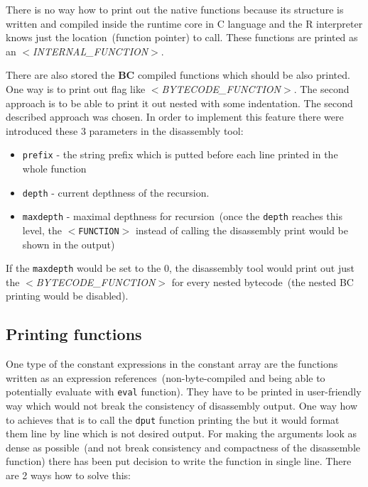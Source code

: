 \documentclass[thesis=M,english]{FITthesis}[2018/10/20]
\newcommand{\code}[1]{\texttt{#1}}
\begin{document}
There is no way how to print out the native functions because its structure is written and compiled inside the runtime core in C language and the R interpreter knows just the location~(function pointer) to call. These functions are printed as an \textit{$<$INTERNAL{\_}FUNCTION$>$}. 

There are also stored the \textbf{BC} compiled functions which should be also printed. One way is to print out flag like \textit{$<$BYTECODE{\_}FUNCTION$>$}. The second approach is to be able to print it out nested with some indentation. The second described approach was chosen. In order to implement this feature there were introduced these 3 parameters in the disassembly tool:

\begin{itemize}
	\item \code{prefix} - the string prefix which is putted before each line printed in the whole function
	
	\item \code{depth} - current depthness of the recursion.
 	
	\item \code{maxdepth} - maximal depthness for recursion~(once the \code{depth} reaches this level, the \code{$<$FUNCTION$>$} instead of calling the disassembly print would be shown in the output)
\end{itemize}

If the \code{maxdepth} would be set to the 0, the disassembly tool would print out just the \textit{$<$BYTECODE{\_}FUNCTION$>$} for every nested bytecode~(the nested BC printing would be disabled).


\subsection{Printing functions}


One type of the constant expressions in the constant array are the functions written as an expression references~(non-byte-compiled and being able to potentially evaluate with \code{eval} function). They have to be printed in user-friendly way which would not break the consistency of disassembly output. One way how to achieves that is to call the \code{dput} function printing the but it would format them line by line which is not desired output. For making the arguments look as dense as possible~(and not break consistency and compactness of the disassemble function) there has been put decision to write the function in single line. There are 2 ways how to solve this:
\end{document}
